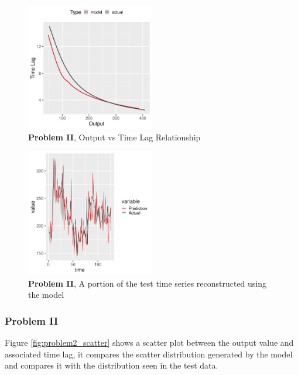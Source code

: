 \documentclass[envcountsect,runningheads]{llncs}
\theoremstyle{etoile}
\begin{document}
\begin{figure}[h]
\vspace{.3in}
\centerline{\includegraphics[width=0.5\textwidth]{figures/exp2_predictive_curves.png}}
\vspace{.3in}
\caption{\textbf{Problem II}, Output vs Time Lag Relationship}
\label{fig:problem2_curves}
\end{figure}

\begin{figure}[h]
\vspace{.3in}
\centerline{\includegraphics[width=0.5\textwidth]{figures/exp2_timeseries_pred.png}}
\vspace{.3in}
\caption{\textbf{Problem II}, A portion of the test time series reconstructed using the model}
\label{fig:problem2_timeseries}
\end{figure}


\subsubsection{Problem II}

Figure \ref{fig:problem2_scatter} shows a scatter plot between the output value and associated 
time lag, it compares the scatter distribution generated by the model and compares it with the 
distribution seen in the test data.
\end{document}

